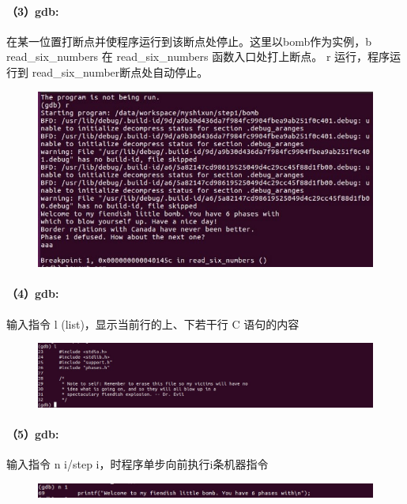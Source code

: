 \documentclass[a4paper, 12pt]{article}
\begin{document}
	\paragraph{（3）gdb:}
	在某一位置打断点并使程序运行到该断点处停止。这里以bomb作为实例，b read\_six\_numbers 在 read\_six\_numbers 函数入口处打上断点。 r 运行，程序运行到 read\_six\_number断点处自动停止。
	\begin{figure}[H]
		\centering
		\includegraphics[width=1\textwidth]{017.jpg}
	\end{figure}
	
	\paragraph{（4）gdb:}
	输入指令 l (list)，显示当前行的上、下若干行 C 语句的内容
	
	\begin{figure}[H]
		\centering
		\includegraphics[width=1\textwidth]{019.jpg}
	\end{figure}
	
	
	\paragraph{（5）gdb:}
	 输入指令 n i/step i，时程序单步向前执行i条机器指令	
	
	
	\begin{figure}[H]
		\centering
		\includegraphics[width=1\textwidth]{018.jpg}
	\end{figure}
	
\end{document}
